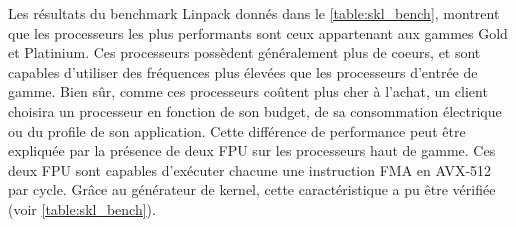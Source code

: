        
        \begin{table}[h!]
        \centering
        \caption{Skylake portfolio: différences principales des SKUs}
        \label{table:skl}
        
        \end{table}
        
        
      Les résultats du benchmark Linpack donnés dans le \autoref{table:skl_bench}, montrent que les processeurs les plus performants sont ceux appartenant aux gammes Gold et Platinium. Ces processeurs possèdent généralement plus de coeurs, et sont capables d'utiliser des fréquences plus élevées que les processeurs d'entrée de gamme. Bien sûr, comme ces processeurs coûtent plus cher à l'achat, un client choisira un processeur en fonction de son budget, de sa consommation électrique ou du profile de son application. Cette différence de performance peut être expliquée par la présence de deux FPU sur les processeurs haut de gamme. Ces deux FPU sont capables d'exécuter chacune une instruction \gls{FMA} en AVX-512 par cycle. Grâce au générateur de kernel, cette caractéristique a pu être vérifiée (voir \autoref{table:skl_bench}).

